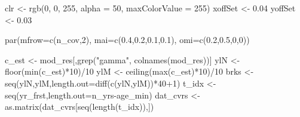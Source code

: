 \documentclass[
  11pt,
]{article}
\newenvironment{Shaded}{}{}
\newcommand{\AttributeTok}[1]{#1}
\newcommand{\DecValTok}[1]{#1}
\newcommand{\FloatTok}[1]{#1}
\newcommand{\FunctionTok}[1]{#1}
\newcommand{\NormalTok}[1]{#1}
\newcommand{\OtherTok}[1]{\textcolor[rgb]{1.00,0.25,0.00}{#1}}
\newcommand{\SpecialCharTok}[1]{\textcolor[rgb]{0.00,0.50,0.50}{#1}}
\newcommand{\StringTok}[1]{\textcolor[rgb]{0.00,0.50,0.50}{#1}}
\begin{document}
\begin{Shaded}
\begin{Highlighting}[]
\NormalTok{clr }\OtherTok{\textless{}{-}} \FunctionTok{rgb}\NormalTok{(}\DecValTok{0}\NormalTok{, }\DecValTok{0}\NormalTok{, }\DecValTok{255}\NormalTok{, }\AttributeTok{alpha =} \DecValTok{50}\NormalTok{, }\AttributeTok{maxColorValue =} \DecValTok{255}\NormalTok{)}
\NormalTok{xoffSet }\OtherTok{\textless{}{-}} \FloatTok{0.04}
\NormalTok{yoffSet }\OtherTok{\textless{}{-}} \FloatTok{0.03}

\FunctionTok{par}\NormalTok{(}\AttributeTok{mfrow=}\FunctionTok{c}\NormalTok{(n\_cov,}\DecValTok{2}\NormalTok{), }\AttributeTok{mai=}\FunctionTok{c}\NormalTok{(}\FloatTok{0.4}\NormalTok{,}\FloatTok{0.2}\NormalTok{,}\FloatTok{0.1}\NormalTok{,}\FloatTok{0.1}\NormalTok{), }\AttributeTok{omi=}\FunctionTok{c}\NormalTok{(}\FloatTok{0.2}\NormalTok{,}\FloatTok{0.5}\NormalTok{,}\DecValTok{0}\NormalTok{,}\DecValTok{0}\NormalTok{))}

\NormalTok{c\_est }\OtherTok{\textless{}{-}}\NormalTok{ mod\_res[,}\FunctionTok{grep}\NormalTok{(}\StringTok{"gamma"}\NormalTok{, }\FunctionTok{colnames}\NormalTok{(mod\_res))]}
\NormalTok{ylN }\OtherTok{\textless{}{-}} \FunctionTok{floor}\NormalTok{(}\FunctionTok{min}\NormalTok{(c\_est)}\SpecialCharTok{*}\DecValTok{10}\NormalTok{)}\SpecialCharTok{/}\DecValTok{10}
\NormalTok{ylM }\OtherTok{\textless{}{-}} \FunctionTok{ceiling}\NormalTok{(}\FunctionTok{max}\NormalTok{(c\_est)}\SpecialCharTok{*}\DecValTok{10}\NormalTok{)}\SpecialCharTok{/}\DecValTok{10}
\NormalTok{brks }\OtherTok{\textless{}{-}} \FunctionTok{seq}\NormalTok{(ylN,ylM,}\AttributeTok{length.out=}\FunctionTok{diff}\NormalTok{(}\FunctionTok{c}\NormalTok{(ylN,ylM))}\SpecialCharTok{*}\DecValTok{40}\SpecialCharTok{+}\DecValTok{1}\NormalTok{)}
\NormalTok{t\_idx }\OtherTok{\textless{}{-}} \FunctionTok{seq}\NormalTok{(yr\_frst,}\AttributeTok{length.out=}\NormalTok{n\_yrs}\SpecialCharTok{{-}}\NormalTok{age\_min)}
\NormalTok{dat\_cvrs }\OtherTok{\textless{}{-}} \FunctionTok{as.matrix}\NormalTok{(dat\_cvrs[}\FunctionTok{seq}\NormalTok{(}\FunctionTok{length}\NormalTok{(t\_idx)),])}


\end{Highlighting}
\end{Shaded}
\end{document}
